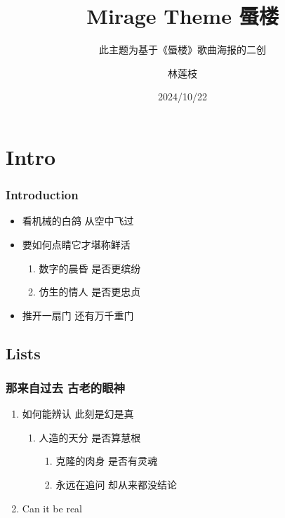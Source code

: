 \documentclass[aspectratio=1610,linespread=1.4,t]{ctexbeamer}
\title{Mirage Theme 蜃楼}
\subtitle{此主题为基于《蜃楼》歌曲海报的二创}
\author{林莲枝}
\institute{《反深代词》专辑已在各大音乐平台上线}
\date{2024/10/22}
\begin{document}
\frame{\maketitle}

\section{Intro}
\begin{frame}
\frametitle{Introduction}

\begin{itemize}
    \item 看机械的白鸽\faDove{} 从空中飞过 
    \item 要如何点睛\faEye[regular] 它才堪称鲜活

\begin{enumerate}
    \item 数字的晨昏\faCloudSun{} 是否更缤纷\faCloudMoon
    \item 仿生的情人\faGrinHearts{} 是否更忠贞\faGrin*[regular]
\end{enumerate}

    \item 推开一扇门\faDoorOpen{} 还有万千重门\faDoorClosed{\small\faDoorClosed}{\footnotesize\faDoorClosed}{\scriptsize\faDoorClosed}{\tiny\faDoorClosed}
\end{itemize}

\end{frame}

\subsection{Lists}
\begin{frame}
\frametitle{那来自过去 古老的眼神}
    \begin{enumerate}
        \item 如何能辨认 此刻是幻是真
        \begin{enumerate}
	        \item 人造的天分 是否算慧根
	        \begin{enumerate}
		        \item 克隆的肉身 是否有灵魂
		        \item 永远在追问 却从来都没结论
	        \end{enumerate}
        \end{enumerate}
        \item \alert{Can it be real}
    \end{enumerate}

\end{frame}
\end{document}
